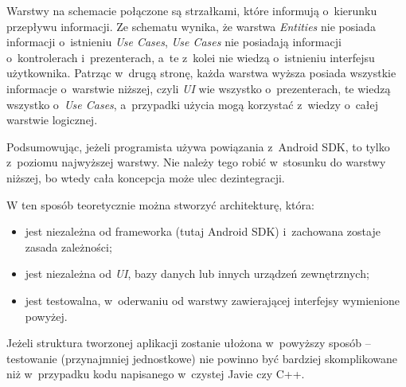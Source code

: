 Warstwy na schemacie połączone są strzałkami, które informują o~kierunku przepływu informacji. Ze schematu wynika, że warstwa \textit{Entities} nie posiada informacji o~istnieniu \textit{Use Cases}, \textit{Use Cases} nie posiadają informacji o~kontrolerach i~prezenterach, a~te z~kolei nie wiedzą o~istnieniu interfejsu użytkownika. Patrząc w~drugą stronę, każda warstwa wyższa posiada wszystkie informacje o~warstwie niższej, czyli \textit{UI} wie wszystko o~prezenterach, te wiedzą wszystko o~\textit{Use Cases}, a~przypadki użycia mogą korzystać z~wiedzy o~całej warstwie logicznej.

Podsumowując, jeżeli programista używa powiązania z~Android SDK, to tylko z~poziomu najwyższej warstwy. Nie należy tego robić w~stosunku do warstwy niższej, bo wtedy cała koncepcja może ulec dezintegracji.

W ten sposób teoretycznie można stworzyć architekturę, która:
\begin{itemize}
\item
jest niezależna od frameworka (tutaj Android SDK) i~zachowana zostaje zasada zależności;
\item
jest niezależna od \textit{UI}, bazy danych lub innych urządzeń zewnętrznych;
\item
jest testowalna, w~oderwaniu od warstwy zawierającej interfejsy wymienione powyżej.
\end{itemize}

Jeżeli struktura tworzonej aplikacji zostanie ułożona w~powyższy sposób – testowanie (przynajmniej jednostkowe) nie powinno być bardziej skomplikowane niż w~przypadku kodu napisanego w~czystej Javie czy C++.
